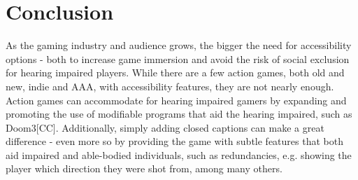 \documentclass{scrartcl}
\begin{document}
\section{Conclusion}

As the gaming industry and audience grows, the bigger the need for accessibility options - both to increase game immersion and avoid the risk of social exclusion for hearing impaired players. While there are a few action games, both old and new, indie and AAA, with accessibility features, they are not nearly enough. Action games can accommodate for hearing impaired gamers by expanding and promoting the use of modifiable programs that aid the hearing impaired, such as Doom3[CC]. Additionally, simply adding closed captions can make a great difference - even more so by providing the game with subtle features that both aid impaired and able-bodied individuals, such as redundancies, e.g. showing the player which direction they were shot from, among many others.



\end{document}
